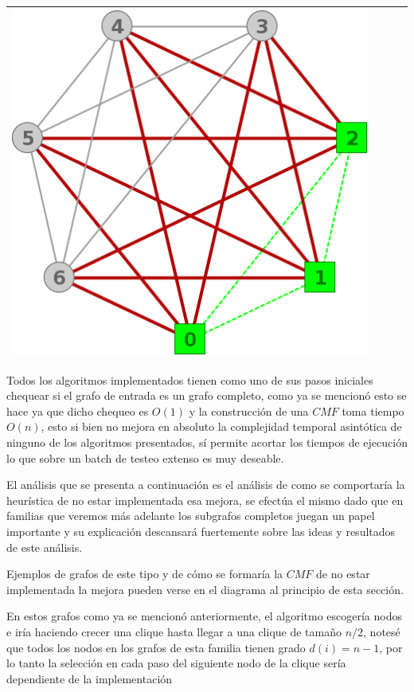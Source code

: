 \begin{center}
\begin{tabular}{ |c||c||c||c| }
			\includegraphics[scale = 0.25]{img/ej3/constructiva_golosa/K7_st3.png} \\
			\hline
		\end{tabular}
	\end{center}

	Todos los algoritmos implementados tienen como uno de sus pasos
	iniciales chequear si el grafo de entrada es un grafo completo, 
	como ya se mencion\'o esto se hace ya que dicho chequeo es $O(1)$
	y la construcci\'on de una $CMF$ toma tiempo $O(n)$, esto si 
	bien no mejora en absoluto la complejidad temporal asint\'otica
	de ninguno de los algoritmos presentados, s\'i permite acortar
	los tiempos de ejecuci\'on lo que sobre un batch de testeo 
	extenso es muy deseable.

	El an\'alisis que se presenta a continuaci\'on es el an\'alisis
	de como se comportar\'ia la heur\'istica de no estar implementada
	esa mejora, se efect\'ua el mismo dado que en familias que 
	veremos m\'as adelante los subgrafos completos juegan un 
	papel importante y su explicaci\'on descansar\'a fuertemente
	sobre las ideas y resultados de este an\'alisis.
	
	Ejemplos de grafos de este tipo y de c\'omo se formar\'ia
	la $CMF$ de no estar implementada la mejora pueden verse
	en el diagrama al principio de esta secci\'on.

	En estos grafos como ya se mencion\'o anteriormente, el algoritmo
	escoger\'ia nodos e ir\'ia haciendo crecer una clique hasta llegar 
	a una 
	clique de tama\~no $n/2$, notes\'e que todos los nodos en los 
	grafos de esta familia tienen grado $d(i) = n - 1$, por lo
	tanto la selecci\'on en cada paso del siguiente nodo de la
	clique ser\'ia dependiente de la implementaci\'on

